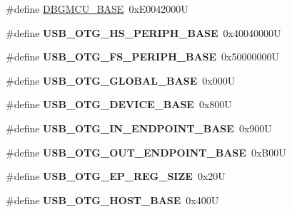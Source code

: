 \begin{DoxyCompactItemize}
\item 
\#define \mbox{\hyperlink{group___peripheral__memory__map_ga4adaf4fd82ccc3a538f1f27a70cdbbef}{D\+B\+G\+M\+C\+U\+\_\+\+B\+A\+SE}}~0x\+E0042000U
\item 
\mbox{\label{group___peripheral__memory__map_gaa405d2ebfd7e9394237b6639f16a5409}} 
\#define {\bfseries U\+S\+B\+\_\+\+O\+T\+G\+\_\+\+H\+S\+\_\+\+P\+E\+R\+I\+P\+H\+\_\+\+B\+A\+SE}~0x40040000U
\item 
\mbox{\label{group___peripheral__memory__map_gaa86d4c80849a74938924e73937b904e7}} 
\#define {\bfseries U\+S\+B\+\_\+\+O\+T\+G\+\_\+\+F\+S\+\_\+\+P\+E\+R\+I\+P\+H\+\_\+\+B\+A\+SE}~0x50000000U
\item 
\mbox{\label{group___peripheral__memory__map_ga044aa4388e72d9d47a03f387fb8926fb}} 
\#define {\bfseries U\+S\+B\+\_\+\+O\+T\+G\+\_\+\+G\+L\+O\+B\+A\+L\+\_\+\+B\+A\+SE}~0x000U
\item 
\mbox{\label{group___peripheral__memory__map_ga4d74a337597a77b1fca978202b519a18}} 
\#define {\bfseries U\+S\+B\+\_\+\+O\+T\+G\+\_\+\+D\+E\+V\+I\+C\+E\+\_\+\+B\+A\+SE}~0x800U
\item 
\mbox{\label{group___peripheral__memory__map_gad8f69041452615aeb3948600e3882246}} 
\#define {\bfseries U\+S\+B\+\_\+\+O\+T\+G\+\_\+\+I\+N\+\_\+\+E\+N\+D\+P\+O\+I\+N\+T\+\_\+\+B\+A\+SE}~0x900U
\item 
\mbox{\label{group___peripheral__memory__map_gaf0e972b8f028ecf44a652029efbd4642}} 
\#define {\bfseries U\+S\+B\+\_\+\+O\+T\+G\+\_\+\+O\+U\+T\+\_\+\+E\+N\+D\+P\+O\+I\+N\+T\+\_\+\+B\+A\+SE}~0x\+B00U
\item 
\mbox{\label{group___peripheral__memory__map_ga6fdb7429ad88e2d69440d6ecc4f4199e}} 
\#define {\bfseries U\+S\+B\+\_\+\+O\+T\+G\+\_\+\+E\+P\+\_\+\+R\+E\+G\+\_\+\+S\+I\+ZE}~0x20U
\item 
\mbox{\label{group___peripheral__memory__map_ga3bb2dd6c82eefd8587b6146ba36ae071}} 
\#define {\bfseries U\+S\+B\+\_\+\+O\+T\+G\+\_\+\+H\+O\+S\+T\+\_\+\+B\+A\+SE}~0x400U

\end{DoxyCompactItemize}
